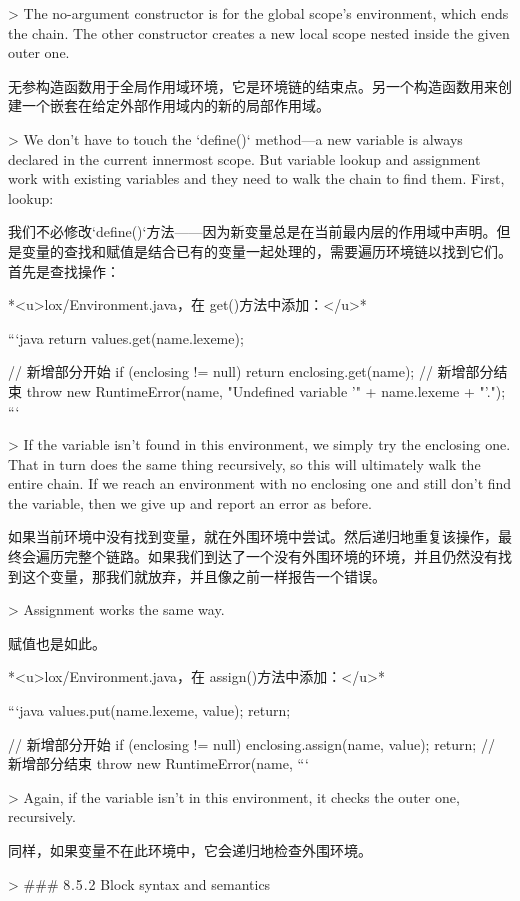 \documentclass[cn,11pt,chinese]{elegantbook}
\begin{document}
{{{{{{> The no-argument constructor is for the global scope’s environment, which ends the chain. The other constructor creates a new local scope nested inside the given outer one.

无参构造函数用于全局作用域环境，它是环境链的结束点。另一个构造函数用来创建一个嵌套在给定外部作用域内的新的局部作用域。

> We don’t have to touch the `define()` method—a new variable is always declared in the current innermost scope. But variable lookup and assignment work with existing variables and they need to walk the chain to find them. First, lookup:

我们不必修改`define()`方法——因为新变量总是在当前最内层的作用域中声明。但是变量的查找和赋值是结合已有的变量一起处理的，需要遍历环境链以找到它们。首先是查找操作：

*<u>lox/Environment.java，在 get()方法中添加：</u>*

```java
      return values.get(name.lexeme);
    }
    // 新增部分开始
    if (enclosing != null) return enclosing.get(name);
    // 新增部分结束
    throw new RuntimeError(name,
        "Undefined variable '" + name.lexeme + "'.");
```

> If the variable isn’t found in this environment, we simply try the enclosing one. That in turn does the same thing recursively, so this will ultimately walk the entire chain. If we reach an environment with no enclosing one and still don’t find the variable, then we give up and report an error as before.

如果当前环境中没有找到变量，就在外围环境中尝试。然后递归地重复该操作，最终会遍历完整个链路。如果我们到达了一个没有外围环境的环境，并且仍然没有找到这个变量，那我们就放弃，并且像之前一样报告一个错误。

> Assignment works the same way.

赋值也是如此。

*<u>lox/Environment.java，在 assign()方法中添加：</u>*

```java
      values.put(name.lexeme, value);
      return;
    }
    // 新增部分开始
    if (enclosing != null) {
      enclosing.assign(name, value);
      return;
    }
    // 新增部分结束
    throw new RuntimeError(name,
```

> Again, if the variable isn’t in this environment, it checks the outer one, recursively.

同样，如果变量不在此环境中，它会递归地检查外围环境。

> ### 8 . 5 . 2 Block syntax and semantics

}}}}
\end{document}
